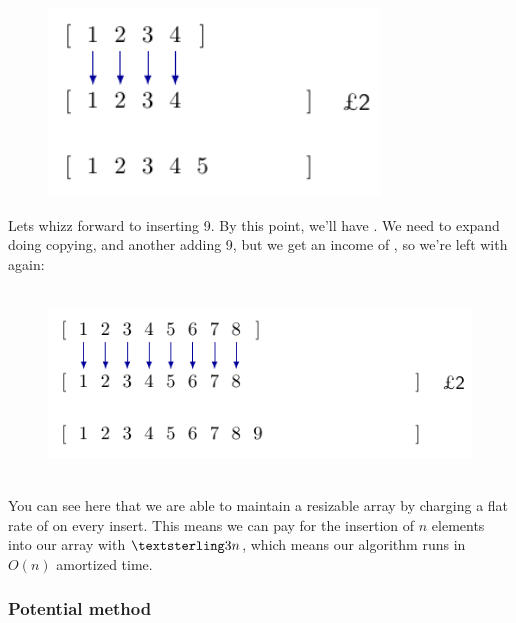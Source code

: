 \begin{figure}[H]
  \centering
  \includegraphics[height=50mm]{diagrams/banker5.pdf}
  \label{banker5}
\end{figure}

Lets whizz forward to inserting 9. By this point, we'll have .
We need to expand  doing copying, and another adding 9, but we
get an income of , so we're left with  again:


\begin{figure}[H]
  \centering
  \includegraphics[height=50mm]{diagrams/banker9.pdf}
  \label{banker9}
\end{figure}

You can see here that we are able to maintain a resizable array by charging a
flat rate of  on every insert. This means we can pay for the
insertion of $n$ elements into our array with $\textsterling 3n$, which means
our algorithm runs in $O(n)$ amortized time.

\subsubsection{Potential method}

